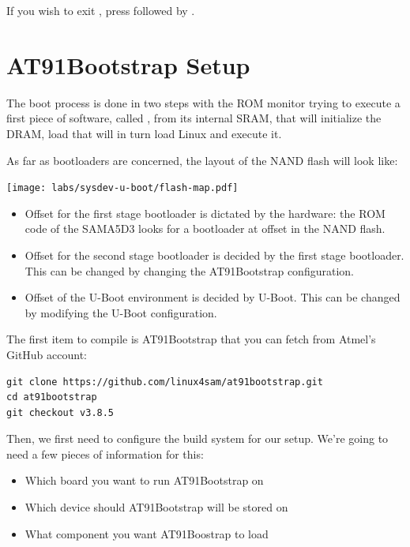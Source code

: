 If you wish to exit , press \code{[Ctrl][a]} followed by
\code{[Ctrl][x]}.

\section{AT91Bootstrap Setup}

The boot process is done in two steps with the ROM monitor trying to
execute a first piece of software, called , from
its internal SRAM, that will initialize the DRAM, load 
that will in turn load Linux and execute it.

As far as bootloaders are concerned, the layout of the NAND flash will
look like:

\begin{center}
  \texttt{[image: labs/sysdev-u-boot/flash-map.pdf]}
\end{center}

\begin{itemize}
\item Offset  for the first stage bootloader is dictated by
  the hardware: the ROM code of the SAMA5D3 looks for a bootloader at
  offset  in the NAND flash.
\item Offset  for the second stage bootloader is decided
  by the first stage bootloader. This can be changed by changing the
  AT91Bootstrap configuration.
\item Offset  of the U-Boot environment is decided by
  U-Boot. This can be changed by modifying the U-Boot configuration.
\end{itemize}

The first item to compile is AT91Bootstrap that you can fetch from
Atmel's GitHub account:

\begin{verbatim}
git clone https://github.com/linux4sam/at91bootstrap.git
cd at91bootstrap
git checkout v3.8.5
\end{verbatim}

Then, we first need to configure the build system for our setup. We're
going to need a few pieces of information for this:

\begin{itemize}
\item Which board you want to run AT91Bootstrap on
\item Which device should AT91Bootstrap will be stored on
\item What component you want AT91Boostrap to load
\end{itemize}

